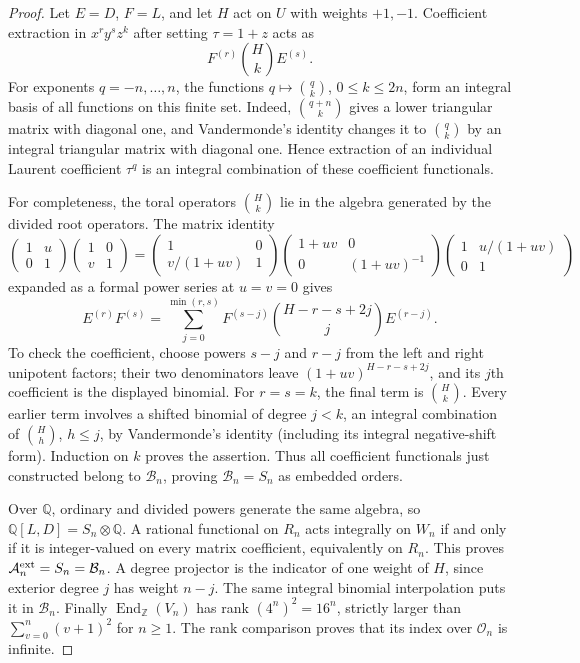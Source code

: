 \documentclass[11pt,a4paper]{article}
\theoremstyle{definition}
\theoremstyle{remark}
\begin{document}
\begin{proof}
Let $E=D$, $F=L$, and let $H$ act on $U$ with weights $+1,-1$.
Coefficient extraction in $x^r y^s z^k$ after setting $\tau=1+z$
acts as
\[
 F^{(r)}\binom Hk E^{(s)}.
\]
For exponents $q=-n,\ldots,n$, the functions $q\mapsto\binom qk$,
$0\leq k\leq2n$, form an integral basis of all functions on this finite
set. Indeed, $\binom{q+n}{k}$ gives a lower triangular matrix with
diagonal one, and Vandermonde's identity changes it to $\binom qk$
by an integral triangular matrix with diagonal one. Hence extraction of
an individual Laurent coefficient $\tau^q$ is an integral combination
of these coefficient functionals.

For completeness, the toral operators $\binom Hk$ lie in the algebra
generated by the divided root operators. The matrix identity
\[
 \begin{pmatrix}1&u\\0&1\end{pmatrix}
 \begin{pmatrix}1&0\\v&1\end{pmatrix}
 =\begin{pmatrix}1&0\\v/(1+uv)&1\end{pmatrix}
  \begin{pmatrix}1+uv&0\\0&(1+uv)^{-1}\end{pmatrix}
  \begin{pmatrix}1&u/(1+uv)\\0&1\end{pmatrix}
\]
expanded as a formal power series at $u=v=0$ gives
\[
 E^{(r)}F^{(s)}=
 \sum_{j=0}^{\min(r,s)}F^{(s-j)}
 \binom{H-r-s+2j}{j}E^{(r-j)}. \tag{IF-02a}
\]
To check the coefficient, choose powers $s-j$ and $r-j$ from the
left and right unipotent factors; their two denominators leave
$(1+uv)^{H-r-s+2j}$, and its $j$th coefficient is the displayed
binomial. For $r=s=k$, the final term is $\binom Hk$. Every earlier
term involves a shifted binomial of degree $j<k$, an integral
combination of $\binom Hh$, $h\leq j$, by Vandermonde's identity
(including its integral negative-shift form). Induction on $k$ proves
the assertion. Thus all coefficient functionals just constructed belong
to $\mathcal B_n$, proving $\mathcal B_n=S_n$ as embedded orders.

Over $\mathbb Q$, ordinary and divided powers generate the same algebra,
so $\mathbb Q[L,D]=S_n\otimes\mathbb Q$. A rational functional on
$R_n$ acts integrally on $W_n$ if and only if it is integer-valued on
every matrix coefficient, equivalently on $R_n$. This proves
$\mathcal A_n^{\rm ext}=S_n=\mathcal B_n$. A degree projector is the
indicator of one weight of $H$, since exterior degree $j$ has weight
$n-j$. The same integral binomial interpolation puts it in
$\mathcal B_n$. Finally $\operatorname{End}_{\mathbb Z}(V_n)$ has rank
$(4^n)^2=16^n$, strictly larger than $\sum_{v=0}^n(v+1)^2$ for
$n\geq1$. The rank comparison proves that its index over $\mathcal O_n$
is infinite.
\end{proof}
\end{document}
